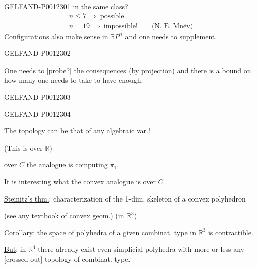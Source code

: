 \begin{GelfandAdjacentEvidence}{GELFAND-P001230}{1}
in the same class?
\begin{gather*}
n\le7\ \Rightarrow\ \text{possible}\\
n=19\ \Rightarrow\ \text{impossible!}\qquad\text{(N. E. Mnëv)}
\end{gather*}
Configurations also make sense in \(\mathbb RP^n\) and one needs to supplement.
\end{GelfandAdjacentEvidence}
\begin{GelfandAdjacentEvidence}{GELFAND-P001230}{2}


One needs to [probe?] the consequences (by projection) and there is a bound on how many one needs to take to have enough.
\end{GelfandAdjacentEvidence}
\begin{GelfandAdjacentEvidence}{GELFAND-P001230}{3}

\end{GelfandAdjacentEvidence}
\begin{GelfandAdjacentEvidence}{GELFAND-P001230}{4}


The topology can be that of any algebraic var.!

(This is over \(\mathbb R\))

over \(C\) the analogue is computing \(\pi_1\).

It is interesting what the convex analogue is over \(C\).

\underline{Steinitz's thm.}: characterization of the 1-dim. skeleton of a convex polyhedron

(see any textbook of convex geom.) (in \(\mathbb R^3\))

\underline{Corollary}: the space of polyhedra of a given combinat. type in \(\mathbb R^3\) is contractible.

\underline{But}: in \(\mathbb R^4\) there already exist even simplicial polyhedra
with more or less any [crossed out] topology of combinat. type.
\end{GelfandAdjacentEvidence}
